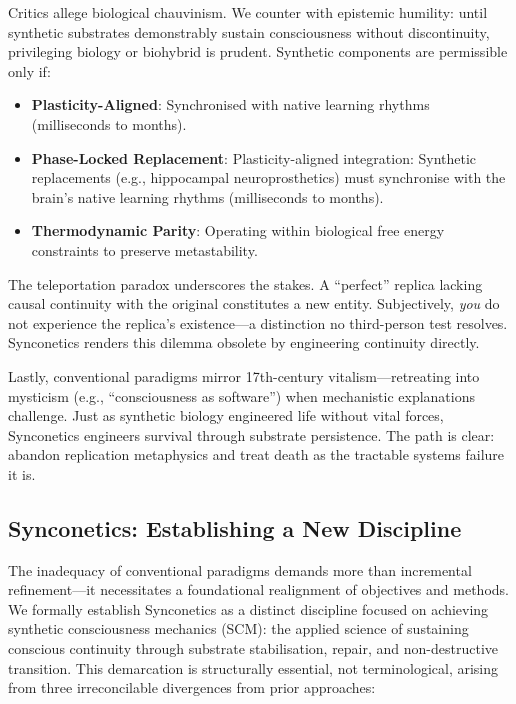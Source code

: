 \documentclass[10pt]{article}
\begin{document}
\begin{sloppypar}
  Critics allege biological chauvinism. We counter with epistemic humility: until synthetic substrates demonstrably sustain consciousness without discontinuity, privileging biology or biohybrid is prudent. Synthetic components are permissible only if:
  \begin{itemize}
    \item \textbf{Plasticity-Aligned}: Synchronised with native learning rhythms (milliseconds to months).
    \item \textbf{Phase-Locked Replacement}: Plasticity-aligned integration: Synthetic replacements (e.g., hippocampal neuroprosthetics) must synchronise with the brain’s native learning rhythms (milliseconds to months).
    \item \textbf{Thermodynamic Parity}: Operating within biological free energy constraints to preserve metastability.
  \end{itemize}

  The teleportation paradox underscores the stakes. A “perfect” replica lacking causal continuity with the original constitutes a new entity. Subjectively, \textit{you} do not experience the replica’s existence—a distinction no third-person test resolves. Synconetics renders this dilemma obsolete by engineering continuity directly.

  Lastly, conventional paradigms mirror 17th-century vitalism—retreating into mysticism (e.g., “consciousness as software”) when mechanistic explanations challenge. Just as synthetic biology engineered life without vital forces, Synconetics engineers survival through substrate persistence. The path is clear: abandon replication metaphysics and treat death as the tractable systems failure it is.

  \subsection{Synconetics: Establishing a New Discipline}
  \label{sec:new-discipline}

  The inadequacy of conventional paradigms demands more than incremental refinement—it necessitates a foundational realignment of objectives and methods. We formally establish Synconetics as a distinct discipline focused on achieving synthetic consciousness mechanics (SCM): the applied science of sustaining conscious continuity through substrate stabilisation, repair, and non-destructive transition. This demarcation is structurally essential, not terminological, arising from three irreconcilable divergences from prior approaches:


\end{sloppypar}
\end{document}
